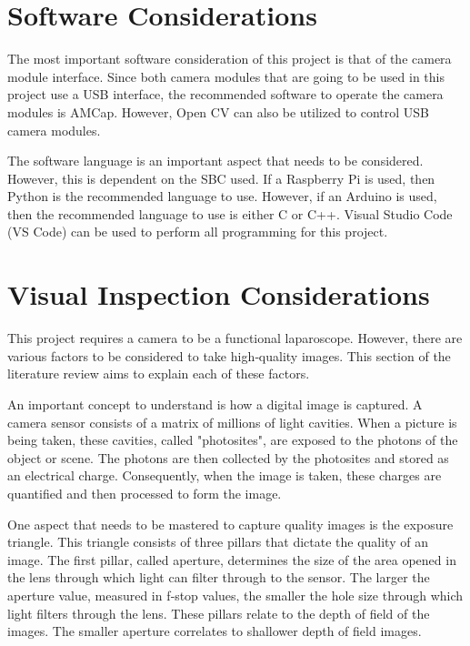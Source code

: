 \section{Software Considerations}
\label{sec:Software Considerations}

 The most important software consideration of this project is that of the camera module interface. Since both camera modules that are going to be used in this project use a USB interface, the recommended software to operate the camera modules is AMCap.  \citep{MR-P} However, Open CV can also be utilized to control USB camera modules.


The software language is an important aspect that needs to be considered. However, this is dependent on the SBC used. If a Raspberry Pi is used, then Python is the recommended language to use. \citep{RP-DOC} However, if an Arduino is used, then the recommended language to use is either C or C++. \citep{A-DOC} Visual Studio Code (VS Code) can be used to perform all programming for this project.


\section{Visual Inspection Considerations}
\label{sec:Visual Inspection Considerations}

This project requires a camera to be a functional laparoscope. However, there are various factors to be considered to take high‑quality images. This section of the literature review aims to explain each of these factors.  

An important concept to understand is how a digital image is captured. A camera sensor consists of a matrix of millions of light cavities. When a picture is being taken, these cavities, called "photosites", are exposed to the photons of the object or scene. The photons are then collected by the photosites and stored as an electrical charge. Consequently, when the image is taken, these charges are quantified and then processed to form the image. \citep{CC-DCS}

One aspect that needs to be mastered to capture quality images is the exposure triangle. This triangle consists of three pillars that dictate the quality of an image. The first pillar, called aperture, determines the size of the area opened in the lens through which light can filter through to the sensor. The larger the aperture value, measured in f‑stop values, the smaller the hole size through which light filters through the lens. These pillars relate to the depth of field of the images. The smaller aperture correlates to shallower depth of field images. \citep{CC-CE}

